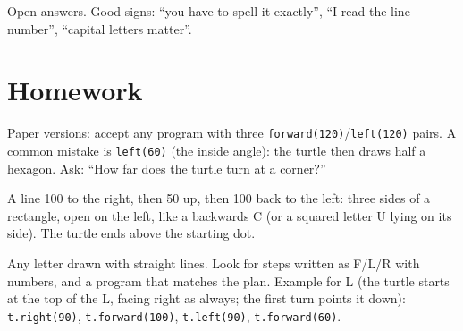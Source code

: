 \begin{answer}[Reflection]
Open answers. Good signs: \enquote{you have to spell it exactly}, \enquote{I read the line number}, \enquote{capital letters matter}.
\end{answer}

\section{Homework}
\begin{answer}
Paper versions: accept any program with three \texttt{forward(120)}/\texttt{left(120)} pairs. A common mistake is \texttt{left(60)} (the inside angle): the turtle then draws half a hexagon. Ask: \enquote{How far does the turtle turn at a corner?}
\end{answer}

\begin{answer}
A line 100 to the right, then 50 up, then 100 back to the left: three sides of a rectangle, open on the left, like a backwards C (or a squared letter U lying on its side). The turtle ends above the starting dot.
\end{answer}

\begin{answer}
Any letter drawn with straight lines. Look for steps written as F/L/R with numbers, and a program that matches the plan. Example for L (the turtle starts at the top of the L, facing right as always; the first turn points it down): \texttt{t.right(90)}, \texttt{t.forward(100)}, \texttt{t.left(90)}, \texttt{t.forward(60)}.
\end{answer}
